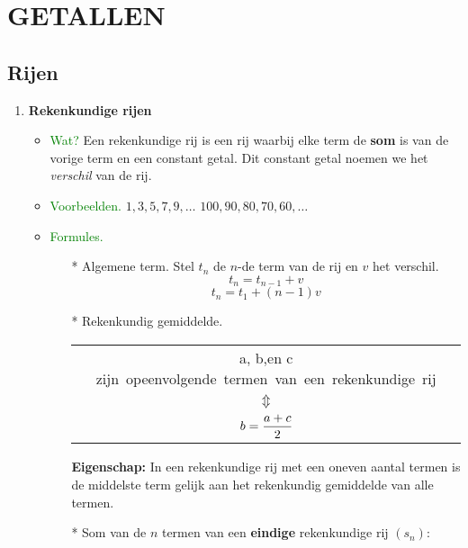 \section{GETALLEN} \label{getallen}
\hypertarget{getallen}{}

\subsection{Rijen} \label{rijen}
\hypertarget{rijen}{}
	\begin{enumerate}%
		\item \hypertarget{rekenkundige_rijen}{{\bf Rekenkundige rijen}}\label{rekenkundige_rijen}
		\begin{itemize}%
		\item \textcolor{green}{Wat?}\newline
		Een rekenkundige rij is een rij waarbij elke term de {\bf som} is van de vorige term 		en een constant getal. Dit constant getal noemen we het {\it verschil} van de rij.
		\item \textcolor{green}{Voorbeelden.}\newline
		$1, 3, 5, 7, 9, \ldots$\newline
		$100, 90, 80, 70, 60, \ldots$
		\item \textcolor{green}{Formules.}\newline
			\begin{itemize}
			\item[*]	Algemene term.\newline
			Stel $t_n$ de $n$-de term van de rij en $v$ het verschil.
			\[t_n=t_{n-1}+v\]
			\[t_n=t_1+ (n-1)v\]
			\item[*] \hypertarget{rekenkundig_gemiddelde}{Rekenkundig gemiddelde}.\label{rekenkundig gemiddelde}\newline
			\begin{tabular}{c}
			 a, b,\:\mbox{en}\: c \:\mbox {zijn opeenvolgende termen van een 			rekenkundige rij}\\
			$\Updownarrow$ \\
			$b = \displaystyle\frac{\displaystyle a+c}{\displaystyle 2}$
			\end{tabular}\vskip 0.5cm
			{\bf Eigenschap:} In een rekenkundige rij met een oneven aantal termen is 			de middelste term gelijk aan het rekenkundig gemiddelde van alle termen.
			\vskip 0.5cm
			\item[*] \hypertarget{som_rekenkundige_rij}{Som van de $n$ termen van een {\bf eindige} rekenkundige rij $(s_n)$:}
			\label{som rekenkundige rij}\newline

\end{itemize}
\end{itemize}
\end{enumerate}
